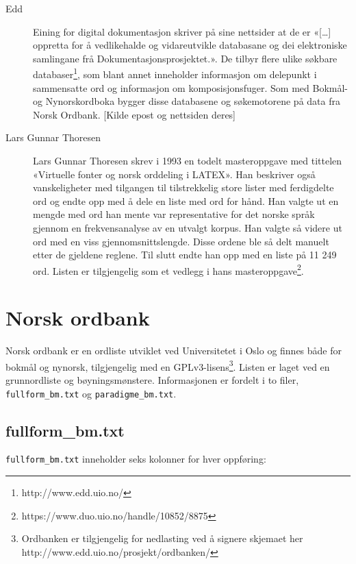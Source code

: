 \begin{description}
\item [Edd]	Eining for digital dokumentasjon skriver på sine nettsider at de er «[…] oppretta for å vedlikehalde og vidareutvikle databasane og dei elektroniske samlingane frå Dokumentasjonsprosjektet.». De tilbyr flere ulike søkbare databaser\footnote{http://www.edd.uio.no/}, som blant annet inneholder informasjon om delepunkt i sammensatte ord og informasjon om komposisjonsfuger. Som med Bokmål- og Nynorskordboka bygger disse databasene og søkemotorene på data fra Norsk Ordbank. [Kilde epost og nettsiden deres] 
\item[Lars Gunnar Thoresen]		Lars Gunnar Thoresen skrev i 1993 en todelt masteroppgave med tittelen «Virtuelle fonter og norsk orddeling i LATEX». Han beskriver også vanskeligheter med tilgangen til tilstrekkelig store lister med ferdigdelte ord og endte opp med å dele en liste med ord for hånd. Han valgte ut en mengde med ord han mente var representative for det norske språk gjennom en frekvensanalyse av en utvalgt korpus. Han valgte så videre ut ord med en viss gjennomsnittslengde. Disse ordene ble så delt manuelt etter de gjeldene reglene. Til slutt endte han opp med en liste på 11 249 ord. \cite{thoresen1993virtuelle} Listen er tilgjengelig som et vedlegg i hans masteroppgave\footnote{https://www.duo.uio.no/handle/10852/8875}.
\end{description}

\section{Norsk ordbank}

Norsk ordbank er en ordliste utviklet ved Universitetet i Oslo og finnes både for bokmål og nynorsk, tilgjengelig med en GPLv3-lisens\footnote{Ordbanken er tilgjengelig for nedlasting ved å signere skjemaet her http://www.edd.uio.no/prosjekt/ordbanken/}. Listen er laget ved en grunnordliste og bøyningsmønstere. Informasjonen er fordelt i to filer, \texttt{fullform\_bm.txt} og \texttt{paradigme\_bm.txt}.

\subsection{fullform\_bm.txt}

\texttt{fullform\_bm.txt} inneholder seks kolonner for hver oppføring:


